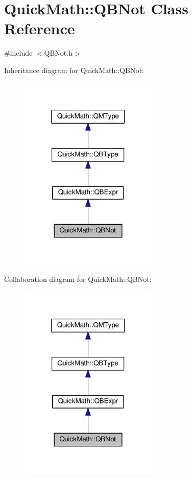 \hypertarget{classQuickMath_1_1QBNot}{}\section{Quick\+Math\+:\+:Q\+B\+Not Class Reference}
\label{classQuickMath_1_1QBNot}


{\ttfamily \#include $<$Q\+B\+Not.\+h$>$}



Inheritance diagram for Quick\+Math\+:\+:Q\+B\+Not\+:
\nopagebreak
\begin{figure}[H]
\begin{center}
\leavevmode
\includegraphics[width=187pt]{classQuickMath_1_1QBNot__inherit__graph}
\end{center}
\end{figure}


Collaboration diagram for Quick\+Math\+:\+:Q\+B\+Not\+:
\nopagebreak
\begin{figure}[H]
\begin{center}
\leavevmode
\includegraphics[width=187pt]{classQuickMath_1_1QBNot__coll__graph}
\end{center}
\end{figure}
